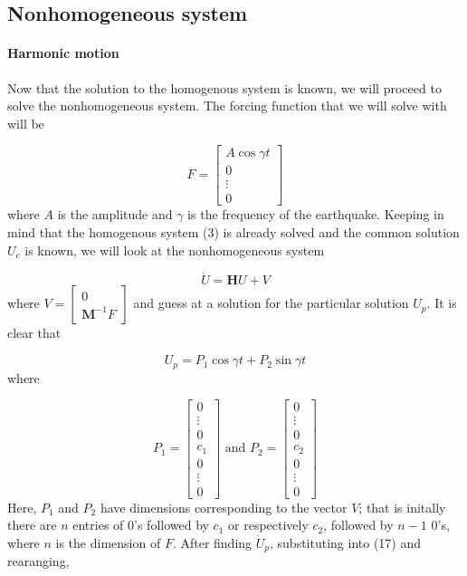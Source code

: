 \documentclass{article}
\begin{document}
					
				\subsection{Nonhomogeneous system}
					
					\paragraph{Harmonic motion} Now that the solution to the homogenous system is known, we will proceed to solve the nonhomogeneous system. The forcing function that we will solve with will be
				
				\begin{equation}
					F = \begin{bmatrix} A\cos{\gamma t}\\ 0 \\ \vdots \\ 0\end{bmatrix}
				\end{equation}
where $A$ is the amplitude and $\gamma$ is the frequency of the earthquake. Keeping in mind that the homogenous system (3) is already solved and the common solution $U_c$ is known, we will look at the nonhomogeneous system

				\begin{equation}
					\dot{U}=\textbf{H}U + V
				\end{equation}
where $V = \begin{bmatrix}0\\ \textbf{M}^{-1}F\end{bmatrix}$ and guess at a solution for the particular solution $U_p$. It is clear that 

				\begin{equation}
					U_p = P_1\cos{\gamma t} +  P_2\sin{\gamma t}
				\end{equation} where 

				\begin{equation*}
					P_1 = 
					\begin{bmatrix} 
						0 \\ \vdots \\  0 \\ c_1\\  0 \\ \vdots \\ 0
					\end{bmatrix} 
					\text{ and } P_2 =  
					\begin{bmatrix} 
						0 \\ \vdots \\  0 \\  c_2\\  0 \\ \vdots \\ 0
					\end{bmatrix}
				\end{equation*}
Here, $P_1$ and $P_2$ have dimensions corresponding to the vector $V$; that is initally there are $n$ entries of 0's followed by $c_1$ or respectively $c_2$, followed by $n-1$ 0's, where $n$ is the dimension of $F$. After finding $\dot{U}_p$, substituting into (17) and rearanging,
\end{document}
